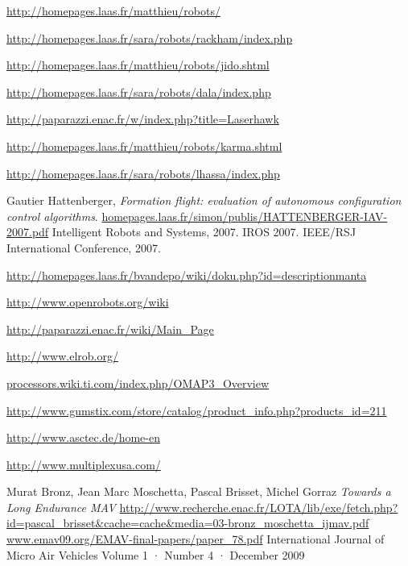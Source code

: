 \documentclass[a4paper,11pt]{report}
\begin{document}
\begin{thebibliography}{9}

  \url{http://homepages.laas.fr/matthieu/robots/}


  \url{http://homepages.laas.fr/sara/robots/rackham/index.php}

  \url{http://homepages.laas.fr/matthieu/robots/jido.shtml}

  \url{http://homepages.laas.fr/sara/robots/dala/index.php}

  \url{http://paparazzi.enac.fr/w/index.php?title=Laserhawk}

  \url{http://homepages.laas.fr/matthieu/robots/karma.shtml}

  \url{http://homepages.laas.fr/sara/robots/lhassa/index.php}

  Gautier Hattenberger,
  \emph{Formation flight: evaluation of autonomous configuration control algorithms}.
  \url{homepages.laas.fr/simon/publis/HATTENBERGER-IAV-2007.pdf}
  Intelligent Robots and Systems, 2007. IROS 2007. IEEE/RSJ International Conference, 
  2007.

  \url{http://homepages.laas.fr/bvandepo/wiki/doku.php?id=descriptionmanta}

  \url{http://www.openrobots.org/wiki}

  \url{http://paparazzi.enac.fr/wiki/Main_Page}

  \url{http://www.elrob.org/}

  \url{processors.wiki.ti.com/index.php/OMAP3_Overview}

  \url{http://www.gumstix.com/store/catalog/product_info.php?products_id=211}

  \url{http://www.asctec.de/home-en}

  \url{http://www.multiplexusa.com/}

  Murat Bronz, Jean Marc Moschetta, Pascal Brisset, Michel Gorraz
  \emph{Towards a Long Endurance MAV}
  \url{http://www.recherche.enac.fr/LOTA/lib/exe/fetch.php?id=pascal_brisset&cache=cache&media=03-bronz_moschetta_ijmav.pdf}
  \url{www.emav09.org/EMAV-final-papers/paper_78.pdf}
  International Journal of Micro Air Vehicles
  Volume 1 · Number 4 · December 2009


\end{thebibliography}
\end{document}
